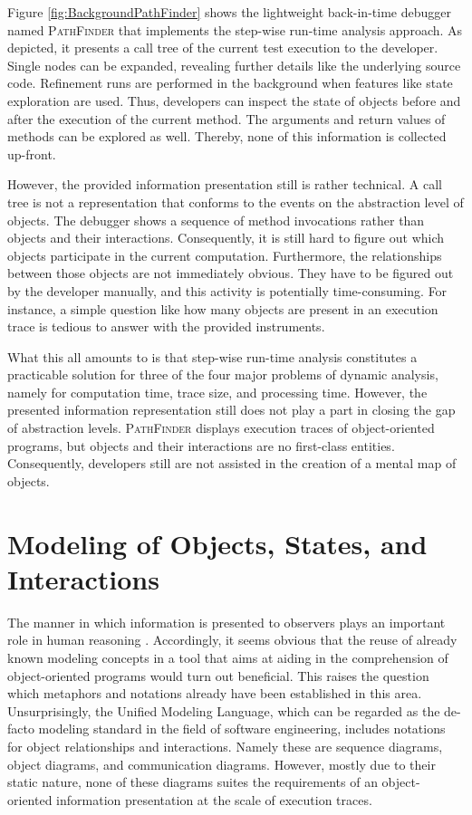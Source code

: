 Figure \ref{fig:BackgroundPathFinder} shows the lightweight back-in-time debugger named \textsc{PathFinder} that implements the step-wise run-time analysis approach.
As depicted, it presents a call tree of the current test execution to the developer.
Single nodes can be expanded, revealing further details like the underlying source code.
Refinement runs are performed in the background when features like state exploration are used.
Thus, developers can inspect the state of objects before and after the execution of the current method.
The arguments and return values of methods can be explored as well.
Thereby, none of this information is collected up-front.

However, the provided information presentation still is rather technical.
A call tree is not a representation that conforms to the events on the abstraction level of objects.
The debugger shows a sequence of method invocations rather than objects and their interactions.
Consequently, it is still hard to figure out which objects participate in the current computation.
Furthermore, the relationships between those objects are not immediately obvious.
They have to be figured out by the developer manually, and this activity is potentially time-consuming.
For instance, a simple question like how many objects are present in an execution trace is tedious to answer with the provided instruments.

What this all amounts to is that step-wise run-time analysis constitutes a practicable solution for three of the four major problems of dynamic analysis, namely for computation time, trace size, and processing time.
However, the presented information representation still does not play a part in closing the gap of abstraction levels.
\textsc{PathFinder} displays execution traces of object-oriented programs, but objects and their interactions are no first-class entities.
Consequently, developers still are not assisted in the creation of a mental map of objects.

\section[Modeling of Objects, States, and Interactions]{Modeling of Objects, States, and Interactions%
}
\label{s:BackgroundModeling}
The manner in which information is presented to observers plays an important role in human reasoning \cite{diehl_software_2007}.
Accordingly, it seems obvious that the reuse of already known modeling concepts in a tool that aims at aiding in the comprehension of object-oriented programs would turn out beneficial.
This raises the question which metaphors and notations already have been established in this area.
Unsurprisingly, the Unified Modeling Language, which can be regarded as the de-facto modeling standard in the field of software engineering, includes notations for object relationships and interactions.
Namely these are sequence diagrams, object diagrams, and communication diagrams.
However, mostly due to their static nature, none of these diagrams suites the requirements of an object-oriented information presentation at the scale of execution traces.

